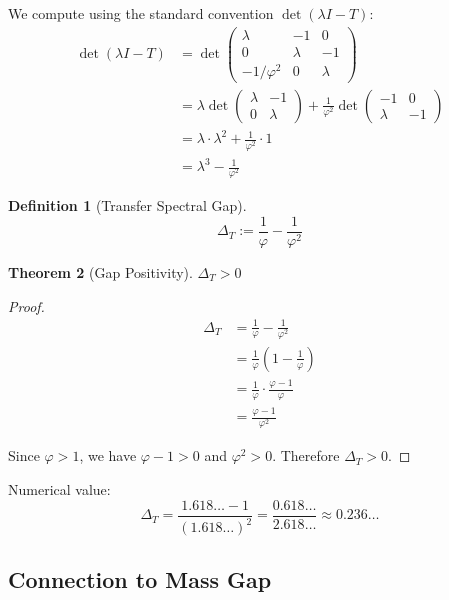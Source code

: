 \documentclass[11pt]{article}
\numberwithin{equation}{section}
\newtheorem{theorem}{Theorem}[section]
\newtheorem{definition}[theorem]{Definition}
\theoremstyle{remark}
\newcommand{\transferGap}{\Delta_T}
\begin{document}
We compute using the standard convention $\det(\lambda I - T)$:
\begin{align}
\det(\lambda I - T) &= \det\begin{pmatrix}
\lambda & -1 & 0\\
0 & \lambda & -1\\
-1/\varphi^2 & 0 & \lambda
\end{pmatrix}\\
&= \lambda \det\begin{pmatrix}
\lambda & -1\\
0 & \lambda
\end{pmatrix} + \frac{1}{\varphi^2} \det\begin{pmatrix}
-1 & 0\\
\lambda & -1
\end{pmatrix}\\
&= \lambda \cdot \lambda^2 + \frac{1}{\varphi^2} \cdot 1\\
&= \lambda^3 - \frac{1}{\varphi^2}
\end{align}

\begin{definition}[Transfer Spectral Gap]
\[\transferGap := \frac{1}{\varphi} - \frac{1}{\varphi^2}\]
\end{definition}

\begin{theorem}[Gap Positivity]
$\transferGap > 0$
\end{theorem}

\begin{proof}
\begin{align}
\transferGap &= \frac{1}{\varphi} - \frac{1}{\varphi^2}\\
&= \frac{1}{\varphi}\left(1 - \frac{1}{\varphi}\right)\\
&= \frac{1}{\varphi} \cdot \frac{\varphi - 1}{\varphi}\\
&= \frac{\varphi - 1}{\varphi^2}
\end{align}

Since $\varphi > 1$, we have $\varphi - 1 > 0$ and $\varphi^2 > 0$.
Therefore $\transferGap > 0$.
\end{proof}

Numerical value:
\[\transferGap = \frac{1.618\ldots - 1}{(1.618\ldots)^2} = \frac{0.618\ldots}{2.618\ldots} \approx 0.236\ldots\]

\subsection{Connection to Mass Gap}
\end{document}
